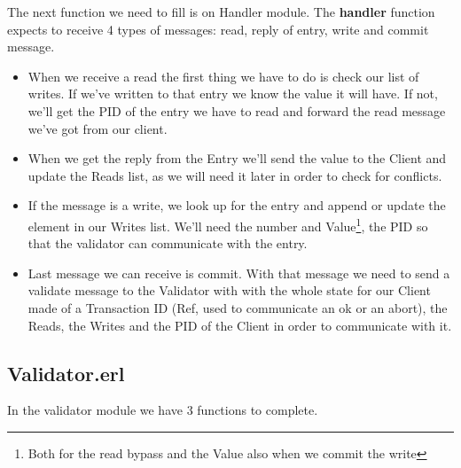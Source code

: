 \documentclass[a4paper, 10pt]{article}
\begin{document}
The next function we need to fill is on Handler module. The \textbf{handler} function expects to receive 4 types of messages: read, reply of entry, write and commit message.

\begin{itemize}
    \item When we receive a read the first thing we have to do is check our list of writes. If we've written to that entry we know the value it will have. If not, we'll get the PID of the entry we have to read and forward the read message we've got from our client. 

  \item When we get the reply from the Entry we'll send the value to the Client and update the Reads list, as we will need it later in order to check for conflicts.
  \item If the message is a write, we look up for the entry and append or update the element in our Writes list. We'll need the number and Value\footnote{Both for the read bypass and the Value also when we commit the write}, the PID so that the validator can communicate with the entry.
  \item Last message we can receive is commit. With that message we need to send a validate message to the Validator with with the whole state for our Client made of a Transaction ID (Ref, used to communicate an ok or an abort), the Reads, the Writes and the PID of the Client in order to communicate with it.
\end{itemize}

\clearpage
\subsection{Validator.erl}

In the validator module we have 3 functions to complete. 
\end{document}
